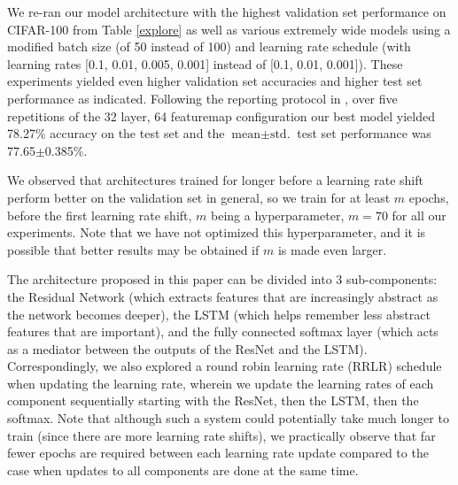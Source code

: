 \documentclass{article}
\begin{document}
We re-ran our model architecture with the highest validation set performance on CIFAR-100 from Table \ref{explore} as well as various extremely wide models %
using a modified batch size (of 50 instead of 100) and learning rate schedule (with learning rates [0.1, 0.01, 0.005, 0.001] instead of [0.1, 0.01, 0.001]). These experiments yielded even higher validation set accuracies and higher test set performance as indicated. Following the reporting protocol in \cite{he2015deep}, over five repetitions of the 32 layer, 64 featuremap configuration our best model yielded 78.27\% accuracy on the test set and the $\textrm{mean} \pm{\textrm{std.}}$ test set performance was 77.65$\pm${0.385}\%. 

We observed that architectures trained for longer before a learning rate shift perform better on the validation set in general, so we train for at least $m$ epochs, before the first learning rate shift, $m$ being a hyperparameter, $m=70$ for all our experiments. Note that we have not optimized this hyperparameter, and it is possible that better results may be obtained if $m$ is made even larger.

The architecture proposed in this paper can be divided into 3 sub-components: the Residual Network (which extracts features that are increasingly abstract as the network becomes deeper), the LSTM (which helps remember less abstract features that are important), and the fully connected softmax layer (which acts as a mediator between the outputs of the ResNet and the LSTM). Correspondingly, we also explored a round robin learning rate (RRLR) schedule when updating the learning rate, wherein we update the learning rates of each component sequentially starting with the ResNet, then the LSTM, then the softmax. Note that although such a system could potentially take much longer to train (since there are more learning rate shifts), we practically observe that far fewer epochs are required between each learning rate update compared to the case when updates to all components are done at the same time.
\end{document}
